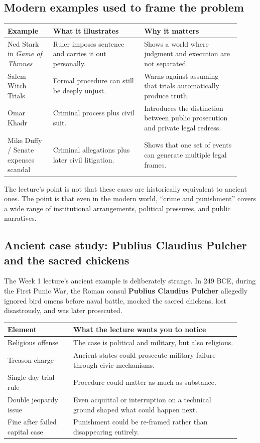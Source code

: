 \documentclass[11pt]{article}
\newcommand{\keyterm}[1]{\textbf{#1}}
\begin{document}
\subsection*{Modern examples used to frame the problem}
\begin{tabular}{@{}p{0.18\linewidth}p{0.36\linewidth}p{0.38\linewidth}@{}}
\toprule
\textbf{Example} & \textbf{What it illustrates} & \textbf{Why it matters} \\
\midrule
Ned Stark in \textit{Game of Thrones} & Ruler imposes sentence and carries it out personally. & Shows a world where judgment and execution are not separated. \\
Salem Witch Trials & Formal procedure can still be deeply unjust. & Warns against assuming that trials automatically produce truth. \\
Omar Khadr & Criminal process plus civil suit. & Introduces the distinction between public prosecution and private legal redress. \\
Mike Duffy / Senate expenses scandal & Criminal allegations plus later civil litigation. & Shows that one set of events can generate multiple legal frames. \\
\bottomrule
\end{tabular}

The lecture's point is not that these cases are historically equivalent to ancient ones. The point is that even in the modern world, ``crime and punishment'' covers a wide range of institutional arrangements, political pressures, and public narratives.

\subsection*{Ancient case study: Publius Claudius Pulcher and the sacred chickens}
The Week 1 lecture's ancient example is deliberately strange. In 249 BCE, during the First Punic War, the Roman consul \keyterm{Publius Claudius Pulcher} allegedly ignored bird omens before naval battle, mocked the sacred chickens, lost disastrously, and was later prosecuted.

\begin{tabular}{@{}p{0.26\linewidth}p{0.66\linewidth}@{}}
\toprule
\textbf{Element} & \textbf{What the lecture wants you to notice} \\
\midrule
Religious offense & The case is political and military, but also religious. \\
Treason charge & Ancient states could prosecute military failure through civic mechanisms. \\
Single-day trial rule & Procedure could matter as much as substance. \\
Double jeopardy issue & Even acquittal or interruption on a technical ground shaped what could happen next. \\
Fine after failed capital case & Punishment could be re-framed rather than disappearing entirely. \\
\bottomrule
\end{tabular}
\end{document}
